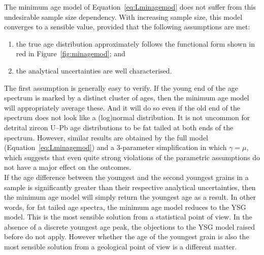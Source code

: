 \begin{refsection}
The minimum age model of Equation~\ref{eq:Lminagemod} does not suffer
from this undesirable sample size dependency. With increasing sample
size, this model converges to a sensible value, provided that the
following assumptions are met:

\begin{enumerate}
\item the true age distribution approximately follows the functional
  form shown in red in Figure~\ref{fig:minagemod}; and
\item the analytical uncertainties are well characterised.
\end{enumerate}

The first assumption is generally easy to verify. If the young end of
the age spectrum is marked by a distinct cluster of ages, then the
minimum age model will appropriately average these. And it will do so
even if the old end of the spectrum does not look like a (log)normal
distribution. It is not uncommon for detrital zircon U--Pb age
distributions to be fat tailed at both ends of the spectrum. However,
similar results are obtained by the full model
(Equation~\ref{eq:Lminagemod}) and a 3-parameter simplification in
which $\gamma=\mu$, which suggests that even quite strong violations
of the parametric assumptions do not have a major effect on the
outcomes.\\

If the age difference between the youngest and the second youngest
grains in a sample is significantly greater than their respective
analytical uncertainties, then the minimum age model will simply
return the youngest age as a result. In other words, for fat tailed
age spectra, the minimum age model reduces to the YSG model. This is
the most sensible solution from a statistical point of view. In the
absence of a discrete youngest age peak, the objections to the YSG
model raised before do not apply. However whether the age of the
youngest grain is also the most sensible solution from a geological
point of view is a different matter.


\end{refsection}
